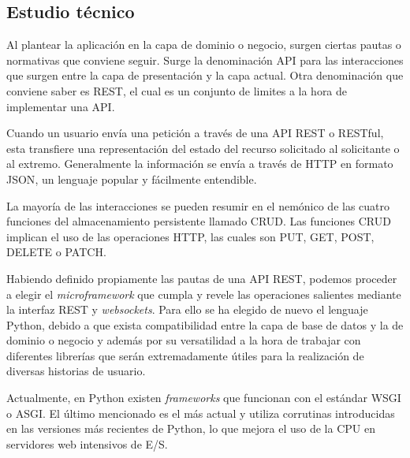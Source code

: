 \subsection{Estudio técnico}
Al plantear la aplicación en la capa de dominio o negocio, surgen ciertas pautas o normativas que conviene seguir. Surge la denominación \ac{API} para las interacciones que surgen entre la capa de presentación y la capa actual. Otra denominación que conviene saber es \ac{REST}, el cual es un conjunto de limites a la hora de implementar una \ac{API}. \cite{redahat-manual}

\vspace{0.3cm}

Cuando un usuario envía una petición a través de una API REST o RESTful, esta transfiere una representación del estado del recurso solicitado al solicitante o al extremo. Generalmente la información se envía a través de \ac{HTTP} en formato \ac{JSON}, un lenguaje popular y fácilmente entendible. \cite{redahat-manual}

\vspace{0.3cm}

La mayoría de las interacciones se pueden resumir en el nemónico de las cuatro funciones del almacenamiento persistente llamado \ac{CRUD}. Las funciones \ac{CRUD} implican el uso de las operaciones \ac{HTTP}, las cuales son PUT, GET, POST, DELETE o PATCH.

\vspace{0.3cm}

Habiendo definido propiamente las pautas de una \ac{API} \ac{REST}, podemos proceder a elegir el \textit{microframework} que cumpla y revele las operaciones salientes mediante la interfaz \ac{REST} y \textit{websockets}. Para ello se ha elegido de nuevo el lenguaje Python, debido a que exista compatibilidad entre la capa de base de datos y la de dominio o negocio y además por su versatilidad a la hora de trabajar con diferentes librerías que  serán extremadamente útiles para la realización de diversas historias de usuario.

\vspace{0.3cm}

Actualmente, en Python existen \textit{frameworks} que funcionan con el estándar \ac{WSGI} o \ac{ASGI}. El último mencionado es el más actual y utiliza corrutinas introducidas en las versiones más recientes de Python, lo que mejora el uso de la CPU en servidores web intensivos de E/S.

\vspace{0.3cm}

